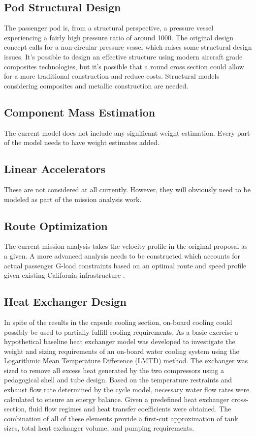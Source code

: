 \documentclass[heading.tex]{subfiles}
\begin{document}
\subsection{Pod Structural Design}
The passenger pod is, from a structural perspective, a pressure vessel experiencing a fairly high pressure ratio of around 1000. The original
design concept calls for a non-circular pressure vessel which raises some structural design issues. It's possible to design an effective
structure using modern aircraft grade composites technologies, but it's possible that a round cross section could allow for a more
traditional construction and reduce costs. Structural models considering composites and metallic construction are needed.

\subsection{Component Mass Estimation}
The current model does not include any significant weight estimation. Every part of the model needs to have weight estimates added.

\subsection{Linear Accelerators}
These are not considered at all currently. However, they will obviously need to be modeled as part of the mission analysis work.

\subsection{Route Optimization} \label{app:route}
The current mission analysis takes the velocity profile in the original proposal as a given. A more
advanced analysis needs to be constructed which accounts for actual passenger G-load constraints based on an optimal route and
speed profile given existing California infrastructure .

\subsection{Heat Exchanger Design} \label{app:heatX}

In spite of the results in the capsule cooling section, on-board cooling could possibly be used to partially fulfill cooling requirements. As a
basic exercise a hypothetical baseline heat exchanger model was developed to investigate the weight and sizing requirements of an 
on-board water cooling system using the Logarithmic Mean Temperature Difference (LMTD) method. \cite{Cengal} \cite{Turns} The
exchanger was sized to remove all excess heat generated by the two compressors using a pedagogical shell and tube design. Based on the
temperature restraints and exhaust flow rate determined by the cycle model, necessary water flow rates were calculated to ensure an
energy balance. Given a predefined heat exchanger cross-section, fluid flow regimes and heat transfer coefficients were obtained. The
combination of all of these elements provide a first-cut approximation of tank sizes, total heat exchanger volume, and pumping
requirements.
\end{document}
